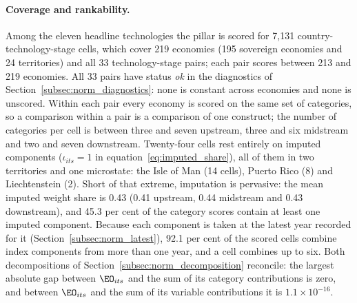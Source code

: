 
\paragraph{Coverage and rankability.} Among the eleven headline technologies the pillar is scored
for 7{,}131 country-technology-stage cells, which cover 219 economies (195 sovereign economies and
24 territories) and all 33 technology-stage pairs; each pair scores between 213 and 219 economies.
All 33 pairs have status \emph{ok} in the diagnostics of Section~\ref{subsec:norm_diagnostics}: none
is constant across economies and none is unscored. Within each pair every economy is scored on the
same set of categories, so a comparison within a pair is a comparison of one construct; the number
of categories per cell is between three and seven upstream, three and six midstream and two and
seven downstream. Twenty-four cells rest entirely on imputed components ($\iota_{its}=1$ in
equation~\eqref{eq:imputed_share}), all of them in two territories and one microstate: the Isle of
Man (14 cells), Puerto Rico (8) and Liechtenstein (2). Short of that extreme, imputation is
pervasive: the mean imputed weight share is 0.43 (0.41 upstream, 0.44 midstream and 0.43
downstream), and 45.3 per cent of the category scores contain at least one imputed component.
Because each component is taken at the latest year recorded for it
(Section~\ref{subsec:norm_latest}), 92.1 per cent of the scored cells combine index components from
more than one year, and a cell combines up to six. Both decompositions of
Section~\ref{subsec:norm_decomposition} reconcile: the largest absolute gap between $\EO_{its}$ and
the sum of its category contributions is zero, and between $\EO_{its}$ and the sum of its variable
contributions it is $1.1\times10^{-16}$.

